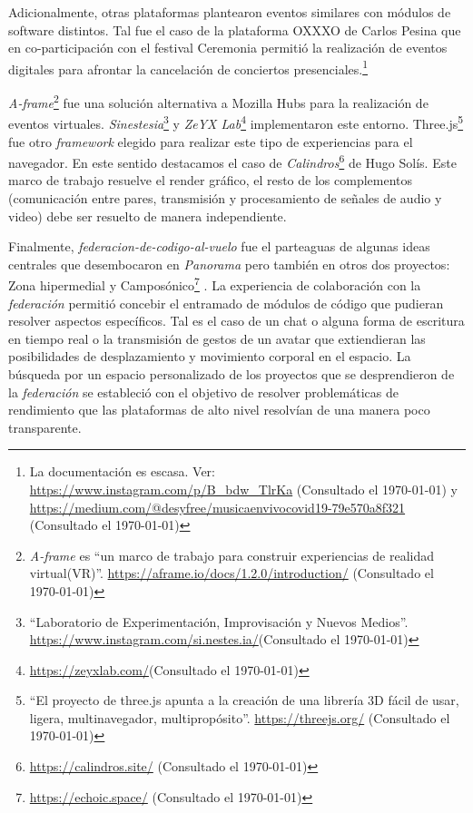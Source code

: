 Adicionalmente, otras plataformas plantearon eventos similares con módulos de software distintos. Tal fue el caso de la plataforma OXXXO de Carlos Pesina que en co-participación con el festival Ceremonia permitió la realización de eventos digitales para afrontar la cancelación de conciertos presenciales.\footnote{La documentación es escasa. Ver: \url{https://www.instagram.com/p/B_bdw_TlrKa} (Consultado el \today) y \url{https://medium.com/@desyfree/musicaenvivocovid19-79e570a8f321} (Consultado el \today)}

\textit{A-frame}\footnote{\textit{A-frame} es ``un marco de trabajo para construir experiencias de realidad virtual(VR)''. \url{https://aframe.io/docs/1.2.0/introduction/} (Consultado el \today)} fue una solución alternativa a Mozilla Hubs para la realización de eventos virtuales. \textit{Sinestesia}\footnote{``Laboratorio de Experimentación, Improvisación y Nuevos Medios''. \url{https://www.instagram.com/si.nestes.ia/}(Consultado el \today)} y \textit{ZeYX Lab}\footnote{\url{https://zeyxlab.com/}(Consultado el \today)} implementaron este entorno. Three.js\footnote{``El proyecto de three.js apunta a la creación de una librería 3D fácil de usar, ligera, multinavegador, multipropósito''. \url{https://threejs.org/} (Consultado el \today)} fue otro \textit{framework} elegido para realizar este tipo de experiencias para el navegador. En este sentido destacamos el caso de \textit{Calindros}\footnote{\url{https://calindros.site/} (Consultado el \today)} de Hugo Solís. Este marco de trabajo resuelve el render gráfico, el resto de los complementos (comunicación entre pares, transmisión y procesamiento de señales de audio y video) debe ser resuelto de manera independiente. %

Finalmente, \textit{federacion-de-codigo-al-vuelo} \citep{en-vivo} fue el parteaguas de algunas ideas centrales que desembocaron en \textit{Panorama} pero también en otros dos proyectos: Zona hipermedial y Camposónico\footnote{\url{https://echoic.space/} (Consultado el \today)} \citep{camposonico}. La experiencia de colaboración con la \textit{federación} permitió concebir el entramado de módulos de código que pudieran resolver aspectos específicos. Tal es el caso de un chat o alguna forma de escritura en tiempo real o la transmisión de gestos de un avatar que extiendieran las posibilidades de desplazamiento y movimiento corporal en el espacio. La búsqueda por un espacio personalizado de los proyectos que se desprendieron de la \textit{federación} se estableció con el objetivo de resolver problemáticas de rendimiento que las plataformas de alto nivel resolvían de una manera poco transparente. 

